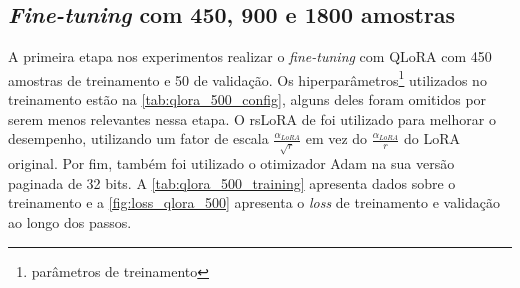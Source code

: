 \subsection{\textit{Fine-tuning} com 450, 900 e 1800 amostras}


A primeira etapa nos experimentos realizar o \textit{fine-tuning} com \ac{QLoRA} com 450 amostras de treinamento e 50 de validação. Os hiperparâmetros\footnote{parâmetros
    de treinamento} utilizados no treinamento estão na \autoref{tab:qlora_500_config}, alguns deles foram omitidos por serem menos relevantes nessa etapa. O \ac{rsLoRA} de
\textcite{kalajdzievski2023rank} foi utilizado para melhorar o desempenho, utilizando um fator de escala \begin{math}\frac{\alpha_{LoRA}}{\sqrt{r}}\end{math} em vez do
\begin{math}\frac{\alpha_{LoRA}}{r}\end{math} do \ac{LoRA} original. Por fim, também foi utilizado o otimizador \ac{Adam} na sua versão paginada de 32 bits. A
\autoref{tab:qlora_500_training} apresenta dados sobre o treinamento e a \autoref{fig:loss_qlora_500} apresenta o \textit{loss} de treinamento e validação ao longo dos
passos.

